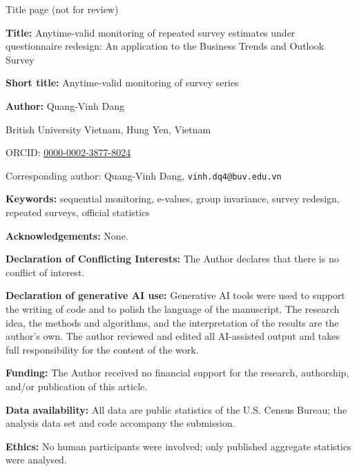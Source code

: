 \documentclass[11pt]{article}
\begin{document}
\noindent Title page (not for review)\bigskip

\noindent\textbf{Title:} Anytime-valid monitoring of repeated survey estimates under questionnaire redesign: An application to the Business Trends and Outlook Survey

\medskip\noindent\textbf{Short title:} Anytime-valid monitoring of survey series

\medskip\noindent\textbf{Author:} Quang-Vinh Dang

\noindent British University Vietnam, Hung Yen, Vietnam

\noindent ORCID: \href{https://orcid.org/0000-0002-3877-8024}{0000-0002-3877-8024}

\noindent Corresponding author: Quang-Vinh Dang, \texttt{vinh.dq4@buv.edu.vn}

\medskip\noindent\textbf{Keywords:} sequential monitoring, e-values, group invariance, survey redesign, repeated surveys, official statistics

\medskip\noindent\textbf{Acknowledgements:} None.

\medskip\noindent\textbf{Declaration of Conflicting Interests:} The Author declares that there is no conflict of interest.

\medskip\noindent\textbf{Declaration of generative AI use:} Generative AI tools were used to support the writing of code and to polish the language of the manuscript. The research idea, the methods and algorithms, and the interpretation of the results are the author's own. The author reviewed and edited all AI-assisted output and takes full responsibility for the content of the work.

\medskip\noindent\textbf{Funding:} The Author received no financial support for the research, authorship, and/or publication of this article.

\medskip\noindent\textbf{Data availability:} All data are public statistics of the U.S. Census Bureau; the analysis data set and code accompany the submission.

\medskip\noindent\textbf{Ethics:} No human participants were involved; only published aggregate statistics were analysed.
\end{document}
